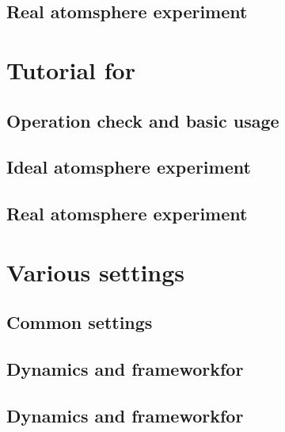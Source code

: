 \documentclass[a4paper]{report}
\begin{document}
 \section{Real atomsphere experiment} \label{chap:tutorial_real}


\chapter{Tutorial for \scalegm}
 \section{Operation check and basic usage}
 \section{Ideal atomsphere experiment}
 \section{Real atomsphere experiment}


\chapter{Various settings} \label{chap:basic_usel}
 \section{Common settings}

 \section{Dynamics and frameworkfor \scalerm}

 \section{Dynamics and frameworkfor \scalegm}
\end{document}
